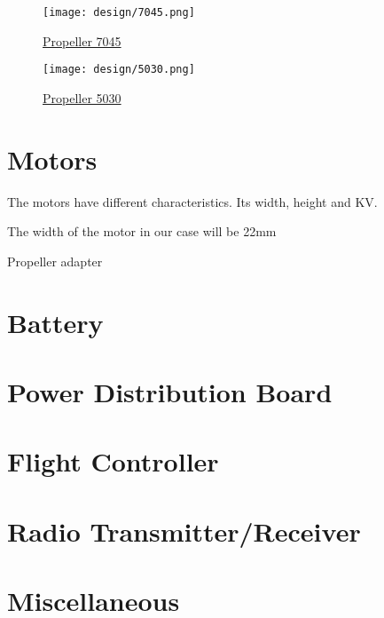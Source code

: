         \begin{figure}[!ht]
            \centering
            \texttt{[image: design/7045.png]}
            \caption{\href{https://www.banggood.com/Style-7050-7x5-DD-Direct-Drive-Propeller-Blade-CW-CCW-For-RC-Airplane-p-1045332.html?rmmds=search&ID=45905&cur_warehouse=CN}{Propeller 7045}}
            \label{fig:7045}
        \end{figure}
        
        \begin{figure}[!ht]
            \centering
            \texttt{[image: design/5030.png]}
            \caption{\href{https://www.banggood.com/2pcs-WSX-5030-53-Inch-ABS-Propeller-White-CWCCW-for-RC-Drone-FPV-Racing-Multirotors-p-1387499.html?rmmds=search&cur_warehouse=CN}{Propeller 5030}}
            \label{fig:5030}
        \end{figure}
        
    \section{Motors}
        The motors have different characteristics. Its width, height and KV.
        
        The width of the motor in our case will be 22mm
        
        Propeller adapter
        
    \section{Battery}
    
    \section{Power Distribution Board}
    
    \section{Flight Controller}
    
    \section{Radio Transmitter/Receiver}
    
    \section{Miscellaneous}
    
